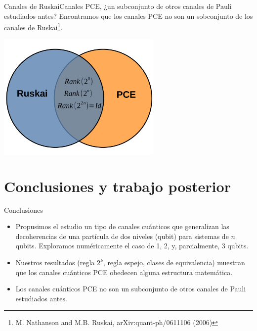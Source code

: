 \documentclass[xcolor=dvipsnames,presentation]{beamer}%
\begin{document}
\begin{frame}{Canales de Ruskai}{Canales PCE, ¿un subconjunto
de otros canales de Pauli estudiados antes?}
	Encontramos que los canales PCE \alert{no son} un sobconjunto
	de los canales de Ruskai\footnote{
	M. Nathanson and M.B. Ruskai, arXiv:quant-ph/0611106 (2006)}.
	
	\begin{center}
	\includegraphics[width=8cm]{diagrama_venn_ruskai_y_pce}
	\end{center}
\end{frame}

\section{Conclusiones y trabajo posterior}

\begin{frame}{Conclusiones}
	\begin{itemize}
		\item Propusimos el estudio un tipo de canales cuánticos que generalizan  
		las decoherencias de una partícula de dos niveles (qubit) para sistemas de
		$n$ qubits. Exploramos numéricamente el caso de 1, 2, y, parcialmente, 3 
		qubits.
		\item Nuestros resultados (regla $2^k$, regla espejo, clases de equivalencia) 
		muestran que los canales cuánticos PCE obedecen alguna estructura matemática.
		\item Los canales cuánticos PCE no son un subconjunto de otros canales 
		de Pauli estudiados antes.
	\end{itemize}
	
	
\end{frame}
\end{document}
